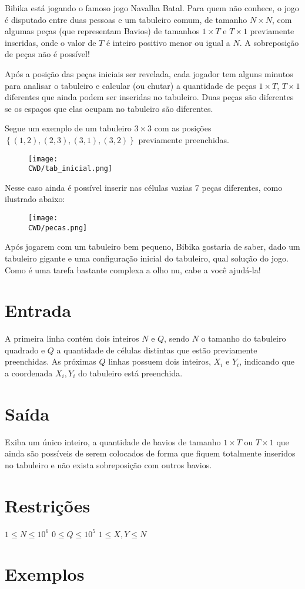 Bibika está jogando o famoso jogo Navalha Batal.
Para quem não conhece, o jogo é disputado entre duas pessoas e um tabuleiro comum, de tamanho $N \times N$, com algumas peças (que representam Bavios) de tamanhos $1 \times T$ e $T \times 1$ previamente inseridas, onde o valor de $T$ é inteiro positivo menor ou igual a $N$.
A sobreposição de peças não é possível!

Após a posição das peças iniciais ser revelada, cada jogador tem alguns minutos para analisar o tabuleiro e calcular (ou chutar) a quantidade de peças $1 \times T$, $T \times 1$ diferentes que ainda podem ser inseridas no tabuleiro.
Duas peças são diferentes se os espaços que elas ocupam no tabuleiro são diferentes.

Segue um exemplo de um tabuleiro $3 \times 3$ com as posições $\left\{(1,2), (2,3), (3,1), (3,2)\right\}$ previamente preenchidas.

\begin{figure}[h!]
\centering
\texttt{[image: \\CWD/tab\_inicial.png]}
\end{figure}

Nesse caso ainda é possível inserir nas células vazias 7 peças diferentes, como ilustrado abaixo:

\begin{figure}[h!]
\centering
\texttt{[image: \\CWD/pecas.png]}
\end{figure}

Após jogarem com um tabuleiro bem pequeno, Bibika gostaria de saber, dado um tabuleiro gigante e uma configuração inicial do tabuleiro, qual solução do jogo. Como é uma tarefa bastante complexa a olho nu, cabe a você ajudá-la!

\section*{Entrada}

A primeira linha contém dois inteiros $N$ e $Q$, sendo $N$ o tamanho do tabuleiro quadrado e $Q$ a quantidade de células distintas que estão previamente preenchidas.
As próximas $Q$ linhas possuem dois inteiros, $X_i$ e $Y_i$, indicando que a coordenada $X_i, Y_i$ do tabuleiro está preenchida.

\section*{Saída}

Exiba um único inteiro, a quantidade de bavios de tamanho $1 \times T$ ou $T \times 1$ que ainda são possíveis de serem colocados de forma que fiquem totalmente inseridos no tabuleiro e não exista sobreposição com outros bavios.

\section*{Restrições}

$1 \leq N \leq 10^6$
$0 \leq Q \leq 10^5$
$1 \leq X, Y \leq N$

\section*{Exemplos}
\exemplo
